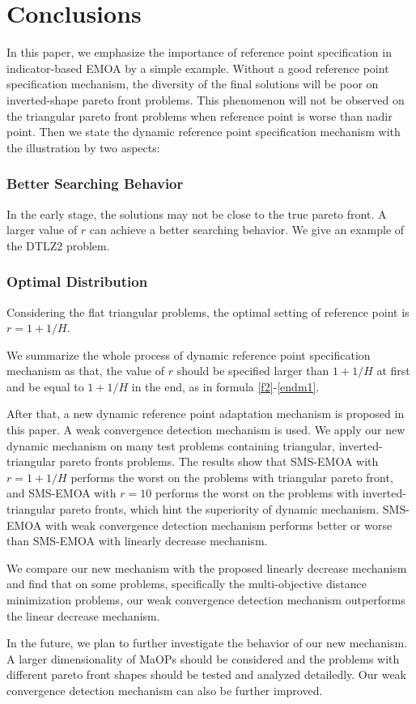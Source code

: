 \documentclass[conference]{IEEEtran}
\begin{document}
\section{Conclusions}
In this paper, we emphasize the importance of reference point specification  
in indicator-based EMOA by a simple example. 
Without a good reference point specification mechanism, the diversity of the final solutions will be poor
on inverted-shape pareto front problems. 
This phenomenon will not be observed on the triangular pareto front problems when reference point is worse than nadir point. 
Then we state the dynamic reference point specification mechanism with the illustration by two aspects:
\subsubsection{Better Searching Behavior} In the early stage, 
the solutions may not be close to the true pareto front. 
A larger value of $r$ can achieve a better searching behavior.
We give an example of the DTLZ2 problem. 
\subsubsection{Optimal Distribution} Considering the flat triangular problems, 
the optimal setting of reference point is $r=1+1/H$. 

We summarize the whole process of dynamic reference point specification mechanism as that,
the value of $r$ should be specified larger than $1+1/H$ at first and be equal to $1+1/H$ in the end,
as in formula \ref{f2}-\ref{endm1}.

After that, a new dynamic reference point adaptation mechanism is proposed in this paper.
A weak convergence detection mechanism is used. 
We apply our new dynamic mechanism on many test problems containing triangular, inverted-triangular pareto fronts problems.
The results show that SMS-EMOA with $r=1+1/H$ performs the worst on the problems with triangular pareto front, 
and SMS-EMOA with $r=10$ performs the worst on the problems with inverted-triangular pareto fronts,
which hint the superiority of dynamic mechanism. 
SMS-EMOA with weak convergence detection mechanism performs better or worse than SMS-EMOA with linearly decrease mechanism.

We compare our new mechanism with the proposed linearly decrease mechanism and find that
on some problems, specifically the multi-objective distance minimization problems,  
our weak convergence detection mechanism outperforms the linear decrease mechanism. 

In the future, we plan to further investigate the behavior of our new mechanism. 
A larger dimensionality of MaOPs should be considered 
and the problems with different pareto front shapes should be tested and analyzed detailedly. 
Our weak convergence detection mechanism can also be further improved. 

 
 
\end{document}
